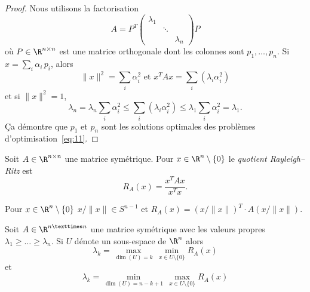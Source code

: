 \begin{proof}
  Nous utilisons la factorisation 
  \begin{displaymath}
    A = P^T
    \begin{pmatrix}
      \lambda_1 \\
      & \ddots \\
      && \lambda_n
    \end{pmatrix} P
  \end{displaymath}
où $P \in \R^{n\times n}$ est une matrice orthogonale dont les colonnes sont $p_1,\dots,p_n$. Si $x = \sum_i \alpha_i \,p_i$,   alors 
\begin{displaymath}
\|x\|^2 = \sum_i \alpha_i^2   \text{ et } x^T A x =  \sum_i (\lambda_i \alpha_i^2)
\end{displaymath}
et si $\|x\|^2 = 1$, 
\begin{displaymath}
\lambda_n =  \lambda_n  \sum_i  \alpha_i^2  \leq  \sum_i (\lambda_i \alpha_i^2) \leq \lambda_1  \sum_i  \alpha_i^2 = \lambda_1. 
\end{displaymath}
Ça démontre que $p_1$ et $p_n$ sont les solutions optimales des problèmes d'optimisation~\eqref{eq:11}. 

\end{proof}



\begin{definition}
  \label{def:23}
  Soit $A \in \R^{n \times n}$ une matrice symétrique. Pour $x \in \R^n\setminus \{0\}$ le  \emph{quotient Rayleigh–Ritz } est 
\begin{displaymath}
  R_A(x) = \frac{x^TAx}{x^Tx}. 
\end{displaymath}
\end{definition}
Pour $x \in \R^n \setminus \{0\}$ $ x / \|x\| \in S^{n-1}$ et $R_A(x) = (x / \|x\| )^T \cdot A  (x / \|x\|)$. 

\begin{theorem}
\label{thr:19}
Soit $A \in \R^{n × n}$ une matrice symétrique avec les valeurs propres 
$\lambda_1 \geq \dots \geq \lambda_n$.   Si $U$ dénote un sous-espace de $\R^n$ alors 
\begin{equation}
  \label{eq:12} 
  \lambda_k = \max_{ \dim(U) = k } \, \min_{x \in U \setminus \{0\}}  R_A(x)  
\end{equation}
et
\begin{equation}
  \label{eq:13}
  \lambda_k = \min_{ \dim(U) = n-k+1 } \, \max_{x \in U \setminus \{0\}}  R_A(x)  
\end{equation}
\end{theorem}

